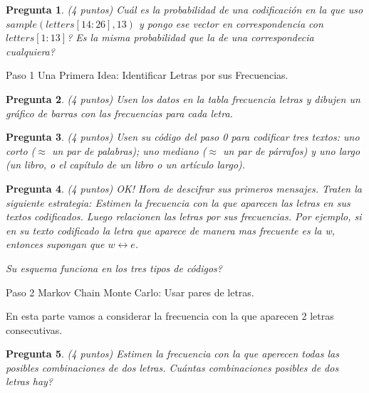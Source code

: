 \documentclass{article}
\newtheorem{pregunta}{Pregunta}
\begin{document}
\begin{pregunta} (4 puntos)
Cu\'al es la probabilidad de una codificaci\'on en la que uso $sample(letters[14:26], 13)$ y pongo ese vector en correspondencia con $letters[1:13]$? Es la misma probabilidad que la de una correspondecia cualquiera?
\end{pregunta}

\begin{topbot}
  \vspace{0.7em}
  Paso 1 \quad Una Primera Idea: Identificar Letras por sus Frecuencias.
  \vspace{0.7em}
\end{topbot}

\begin{pregunta} (4 puntos)
Usen los datos en la tabla frecuencia letras y dibujen un gráfico de barras con las frecuencias para cada letra.
\end{pregunta}

\begin{pregunta} (4 puntos)
Usen su código del paso 0 para codificar tres textos: uno corto ($\approx$ un par de palabras); uno mediano ($\approx$ un par de párrafos) y uno largo (un libro, o el capítulo de un libro o un artículo largo).
\end{pregunta}

\begin{pregunta} (4 puntos)
  OK! Hora de descifrar sus primeros mensajes. Traten la siguiente estrategia:
  Estimen la frecuencia con la que aparecen las letras en sus textos codificados. Luego relacionen las letras por sus frecuencias. Por ejemplo, si en su texto codificado la letra que aparece de manera mas frecuente es la w, entonces supongan que $w \longleftrightarrow e$.

  Su esquema funciona en los tres tipos de c\'odigos?
\end{pregunta}

\begin{topbot}
  \vspace{0.7em}
  Paso 2 \quad Markov Chain Monte Carlo: Usar pares de letras.
  \vspace{0.7em}
\end{topbot}

En esta parte vamos a considerar la frecuencia con la que aparecen 2 letras consecutivas.

\begin{pregunta} (4 puntos)
  Estimen la frecuencia con la que aperecen todas las posibles combinaciones de dos letras. Cu\'antas combinaciones posibles de dos letras hay?
\end{pregunta}
\end{document}
